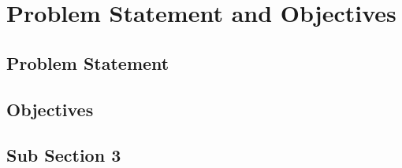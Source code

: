 \chapter{Problem Statement and Objectives}

    \lipsum[2-3]

    \section{Problem Statement}
    \lipsum[2-4]
    
    \section{Objectives}
    \lipsum[2-4]
    
    \section{Sub Section 3}

    \lipsum[2]